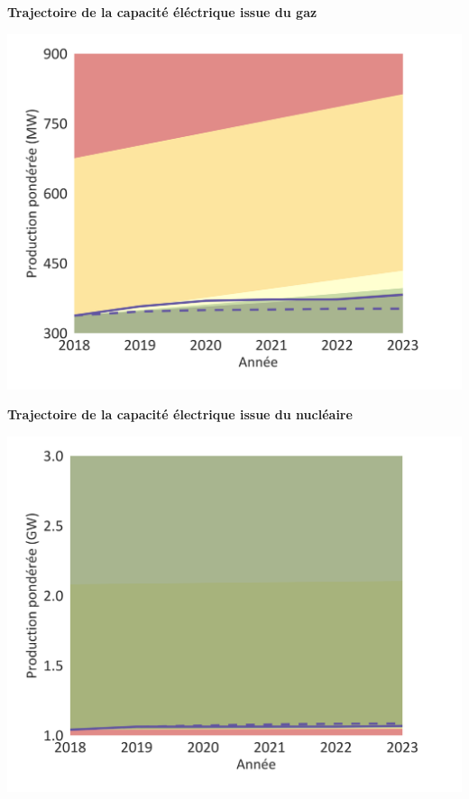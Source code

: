 \documentclass[10pt,table,a4]{article}\usepackage[]{graphicx}\usepackage[]{color}
\begin{document}
	\hspace{.02\linewidth}
	\begin{minipage}[t]{.49\textwidth}
		\begin{center}
		\textbf{Trajectoire de la capacité éléctrique issue du gaz}
		\end{center}
		\includegraphics[trim = {0 0cm 0 0},width=1\linewidth]{ReportOutputs/Fig09}
		
		
		\vspace{0.1cm}
		\begin{center}
		\textbf{Trajectoire de la capacité électrique issue du nucléaire}
		\newline
		\end{center}
		\includegraphics[trim = {0 0cm 0 0},width=1\linewidth]{ReportOutputs/Fig10}
		
		
	\end{minipage}
	
\end{document}
